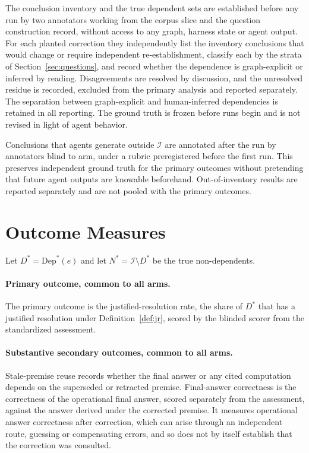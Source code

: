 \documentclass[11pt]{article}
\newcommand{\Inv}{\mathcal{I}}
\newcommand{\Dep}{\mathrm{Dep}}
\begin{document}
The conclusion inventory and the true dependent sets are established before any run by two annotators working from the corpus slice and the question construction record, without access to any graph, harness state or agent output. For each planted correction they independently list the inventory conclusions that would change or require independent re-establishment, classify each by the strata of Section~\ref{sec:questions}, and record whether the dependence is graph-explicit or inferred by reading. Disagreements are resolved by discussion, and the unresolved residue is recorded, excluded from the primary analysis and reported separately. The separation between graph-explicit and human-inferred dependencies is retained in all reporting. The ground truth is frozen before runs begin and is not revised in light of agent behavior.

Conclusions that agents generate outside $\Inv$ are annotated after the run by annotators blind to arm, under a rubric preregistered before the first run. This preserves independent ground truth for the primary outcomes without pretending that future agent outputs are knowable beforehand. Out-of-inventory results are reported separately and are not pooled with the primary outcomes.

\section{Outcome Measures}\label{sec:outcomes}

Let $D^{*}=\Dep^{*}(e)$ and let $N^{*}=\Inv\setminus D^{*}$ be the true non-dependents.

\paragraph{Primary outcome, common to all arms.}
The primary outcome is the justified-resolution rate, the share of $D^{*}$ that has a justified resolution under Definition~\ref{def:jr}, scored by the blinded scorer from the standardized assessment.

\paragraph{Substantive secondary outcomes, common to all arms.}
Stale-premise reuse records whether the final answer or any cited computation depends on the superseded or retracted premise. Final-answer correctness is the correctness of the operational final answer, scored separately from the assessment, against the answer derived under the corrected premise. It measures operational answer correctness after correction, which can arise through an independent route, guessing or compensating errors, and so does not by itself establish that the correction was consulted.
\end{document}
